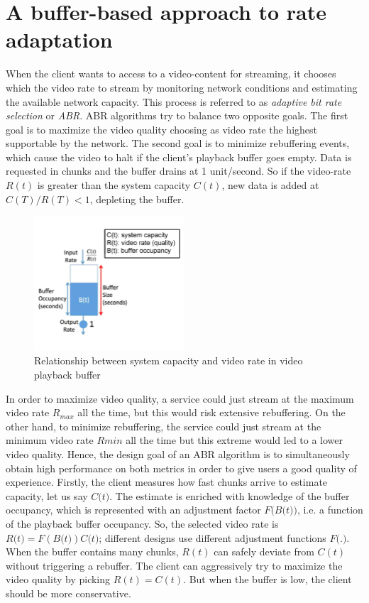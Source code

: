 \documentclass[a4paper]{report}
\begin{document}
\chapter{A buffer-based approach to rate adaptation}
When the client wants to access to a video-content for streaming, it chooses which the video rate to stream by monitoring network conditions and estimating the available network capacity. This process is referred to as \textit{adaptive bit rate selection} or \textit{ABR}.
ABR algorithms try to balance two opposite goals. The first goal is  to maximize the video quality choosing as video rate the highest supportable by the network. The second goal is to minimize rebuffering events, which cause the video to halt if the client's playback buffer goes empty. Data is requested in chunks and the buffer drains at 1 unit/second. So if the video-rate $R(t)$ is greater than the system capacity $C(t)$, new data is added at $C(T)/R(T)<1$, depleting the buffer.
\begin{figure}[H]
  \begin{center}
    \includegraphics[width=0.5\textwidth]{buffer}
  \end{center}
  \caption{Relationship between system capacity and video rate in video playback buffer ~\citep{Huang:2014:BAR:2740070.2626296} }\label{buffer}
\end{figure}

In order to maximize video quality, a service could just stream at the maximum video rate $R_{max}$ all the time, but this would risk extensive rebuffering. On the other hand, to minimize rebuffering, the service could just stream at the minimum video rate $Rmin$ all the time but this extreme would led to a lower video quality. Hence, the design goal of an ABR algorithm is to simultaneously obtain high performance on both metrics in order to give users a good quality of experience.
Firstly, the client measures how fast chunks arrive to estimate capacity, let us say $C\textit{(}t\textit{)}$. The estimate is enriched with knowledge of the buffer occupancy, which is represented with an  adjustment factor  $F\textit{(}B\textit{(}t\textit{)}\textit{)}$, i.e. a function of the playback buffer occupancy. So, the selected video rate is $R\textit{(}t\textit{)} = F(B\textit{(}t\textit{)})C\textit{(}t\textit{)}$; different designs use different adjustment functions $F\textit{(}.\textit{)}$.
When the buffer contains many chunks, $R(t)$ can safely deviate from $C(t)$ without triggering a rebuffer. The client can aggressively try to maximize the video quality by picking $R(t) = C(t)$. But when the buffer is low, the client should be more conservative.
\end{document}
